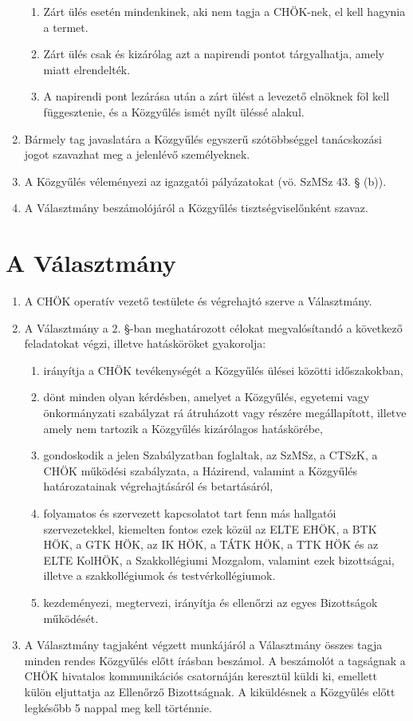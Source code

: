 \documentclass{../styles/rulebook}
\begin{document}
\begin{enumerate}
	\begin{enumerate}
		\item Zárt ülés esetén mindenkinek, aki nem tagja a CHÖK-nek, el kell hagynia a termet.
		\item Zárt ülés csak és kizárólag azt a napirendi pontot tárgyalhatja, amely miatt elrendelték.
		\item A napirendi pont lezárása után a zárt ülést a levezető elnöknek föl kell függesztenie, és a Közgyűlés ismét nyílt üléssé alakul.
	\end{enumerate}
	\item Bármely tag javaslatára a Közgyűlés egyszerű szótöbbséggel tanácskozási jogot szavazhat meg a jelenlévő személyeknek.
	\item A Közgyűlés véleményezi az igazgatói pályázatokat (vö. SzMSz 43. § (b)).
	\item A Választmány beszámolójáról a Közgyűlés tisztségviselőnként szavaz.
\end{enumerate}


\section{A Választmány}

\begin{enumerate}
	\item A CHÖK operatív vezető testülete és végrehajtó szerve a Választmány.
	\item A Választmány a 2. §-ban meghatározott célokat megvalósítandó a következő feladatokat végzi, illetve hatásköröket gyakorolja:
	\begin{enumerate}
		\item irányítja a CHÖK tevékenységét a Közgyűlés ülései közötti időszakokban,
		\item dönt minden olyan kérdésben, amelyet a Közgyűlés, egyetemi vagy önkormányzati szabályzat rá átruházott vagy részére megállapított, illetve amely nem tartozik a Közgyűlés kizárólagos hatáskörébe,
		\item gondoskodik a jelen Szabályzatban foglaltak, az SzMSz, a CTSzK, a CHÖK működési szabályzata, a Házirend, valamint a Közgyűlés határozatainak végrehajtásáról és betartásáról,
		\item folyamatos és szervezett kapcsolatot tart fenn más hallgatói szervezetekkel, kiemelten fontos ezek közül az ELTE EHÖK, a BTK HÖK, a GTK HÖK, az IK HÖK, a TÁTK HÖK, a TTK HÖK és az ELTE KolHÖK, a Szakkollégiumi Mozgalom, valamint ezek bizottságai, illetve a szakkollégiumok és testvérkollégiumok.
		\item kezdeményezi, megtervezi, irányítja és ellenőrzi az egyes Bizottságok működését.
	\end{enumerate}
	\item A Választmány tagjaként végzett munkájáról a Választmány összes tagja minden rendes  Közgyűlés előtt írásban beszámol. A beszámolót a tagságnak a CHÖK hivatalos kommunikációs csatornáján keresztül küldi ki, emellett külön eljuttatja az Ellenőrző Bizottságnak. A kiküldésnek a Közgyűlés előtt legkésőbb 5 nappal meg kell történnie.
\end{enumerate}
\end{document}
